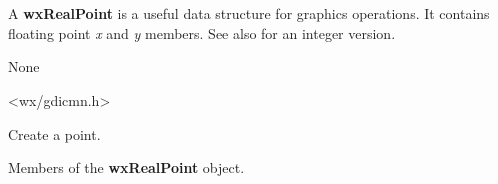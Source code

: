 \section{}\label{wxrealpoint}

A {\bf wxRealPoint} is a useful data structure for graphics operations.
It contains floating point {\it x} and {\it y} members.
See also  for an integer version.


None


<wx/gdicmn.h>




\label{wxrealpointctor}



Create a point.



Members of the {\bf wxRealPoint} object.


